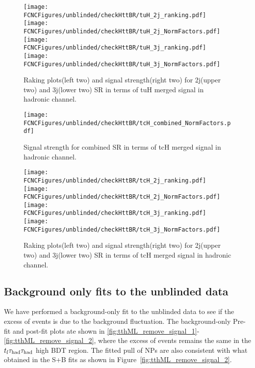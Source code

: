\begin{figure}[H]
\centering
\texttt{[image: \\FCNCFigures/unblinded/checkHttBR/tuH\_2j\_ranking.pdf]}
\texttt{[image: \\FCNCFigures/unblinded/checkHttBR/tuH\_2j\_NormFactors.pdf]}
\\
\texttt{[image: \\FCNCFigures/unblinded/checkHttBR/tuH\_3j\_ranking.pdf]}
\texttt{[image: \\FCNCFigures/unblinded/checkHttBR/tuH\_3j\_NormFactors.pdf]}
\caption{Raking plots(left two) and signal strength(right two) for 2j(upper two) and 3j(lower two) SR in terms of tuH merged signal in hadronic channel.}
\label{fig:xTFW_tuH_23j_NF}
\end{figure}


\begin{figure}[H]
\centering
\texttt{[image: \\FCNCFigures/unblinded/checkHttBR/tcH\_combined\_NormFactors.pdf]}
\\
\caption{Signal strength for combined SR in terms of tcH merged signal in hadronic channel.}
\label{fig:xTFW_tcH_NF}
\end{figure}

\begin{figure}[H]
\centering
\texttt{[image: \\FCNCFigures/unblinded/checkHttBR/tcH\_2j\_ranking.pdf]}
\texttt{[image: \\FCNCFigures/unblinded/checkHttBR/tcH\_2j\_NormFactors.pdf]}
\\
\texttt{[image: \\FCNCFigures/unblinded/checkHttBR/tcH\_3j\_ranking.pdf]}
\texttt{[image: \\FCNCFigures/unblinded/checkHttBR/tcH\_3j\_NormFactors.pdf]}
\caption{Raking plots(left two) and signal strength(right two) for 2j(upper two) and 3j(lower two) SR in terms of tcH merged signal in hadronic channel.}
\label{fig:xTFW_tcH_23j_NF}
\end{figure}



\subsection{Background only fits to the unblinded data}

We have performed a background-only fit to the unblinded data to see if the excess of events is due to the background fluctuation.
The background-only Pre-fit and post-fit plots ate shown in \ref{fig:tthML_remove_signal_1}-\ref{fig:tthML_remove_signal_2}, where the excess of events remains the same
in the $t_l\tau_\text{had}{}\tau_\text{had}$ high BDT region. The fitted pull of NPs are also consistent with what obtained in the S+B fits as shown in Figure~\ref{fig:tthML_remove_signal_2}.

